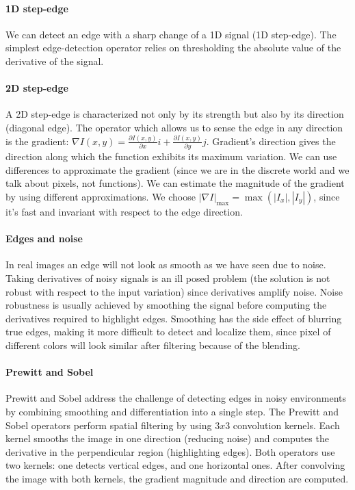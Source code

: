 \documentclass{article}
\begin{document}
\paragraph{1D step-edge}
We can detect an edge with a sharp change of a 1D signal (1D step-edge).
The simplest edge-detection operator relies on thresholding the absolute value of the derivative of the signal.

\paragraph{2D step-edge}
A 2D step-edge is characterized not only by its strength but also by its direction (diagonal edge).
The operator which allows us to sense the edge in any direction is the gradient: $\nabla I(x,y) = \frac{\partial I(x,y)}{\partial x}i + \frac{\partial I(x,y)}{\partial y}j$.
Gradient's direction gives the direction along which the function exhibits its maximum variation.
We can use differences to approximate the gradient (since we are in the discrete world and we talk about pixels, not functions).
We can estimate the magnitude of the gradient by using different approximations.
We choose $|\nabla I|_{\max}=\max(|I_x|, |I_y|)$, since it's fast and invariant with respect to the edge direction.

\paragraph{Edges and noise}
In real images an edge will not look as smooth as we have seen due to noise.
Taking derivatives of noisy signals is an ill posed problem (the solution is not robust with respect to the input variation) since derivatives amplify noise.
Noise robustness is usually achieved by smoothing the signal before computing the derivatives required to highlight edges.
Smoothing has the side effect of blurring true edges, making it more difficult to detect and localize them, since pixel of different colors will look similar after filtering because of the blending.

\paragraph{Prewitt and Sobel}
Prewitt and Sobel address the challenge of detecting edges in noisy environments by combining smoothing and differentiation into a single step.
The Prewitt and Sobel operators perform spatial filtering by using $3x3$ convolution kernels.
Each kernel smooths the image in one direction (reducing noise) and computes the derivative in the perpendicular region (highlighting edges).
Both operators use two kernels: one detects vertical edges, and one horizontal ones.
After convolving the image with both kernels, the gradient magnitude and direction are computed.
\end{document}
